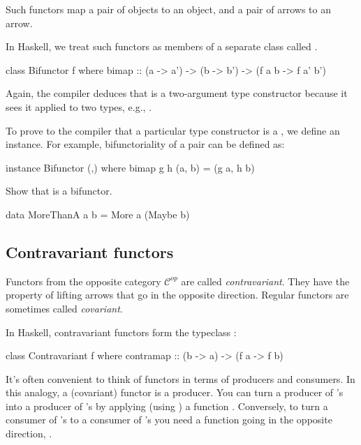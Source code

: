 \documentclass[DaoFP]{subfiles}
\begin{document}
Such functors map a pair of objects to an object, and a pair of arrows to an arrow. 

In Haskell, we treat such functors as members of a separate class called .

\begin{haskell}
class Bifunctor f where
  bimap :: (a -> a') -> (b -> b') -> (f a b -> f a' b')
\end{haskell}
Again, the compiler deduces that  is a two-argument type constructor because it sees it applied to two types, e.g., .

To prove to the compiler that a particular type constructor is a , we define an instance. For example, bifunctoriality of a pair can be defined as:
\begin{haskell}
instance Bifunctor (,) where
  bimap g h (a, b) = (g a, h b)
\end{haskell}

\begin{exercise}
Show that  is a bifunctor.
\begin{haskell}
data MoreThanA a b = More a (Maybe b)
\end{haskell}
\end{exercise}


\subsection{Contravariant functors}

Functors from the opposite category $\mathcal{C}^{op}$ are called \emph{contravariant}. They have the property of lifting arrows that go in the opposite direction. Regular functors are sometimes called \emph{covariant}.

In Haskell, contravariant functors form the typeclass :
\begin{haskell}
class Contravariant f where
  contramap :: (b -> a) -> (f a -> f b)
\end{haskell}

It's often convenient to think of functors in terms of producers and consumers. In this analogy, a (covariant) functor is a producer. You can turn a producer of 's into a producer of 's by applying (using ) a function . Conversely, to turn a consumer of 's to a consumer of 's you need a function going in the opposite direction, . 
\end{document}
